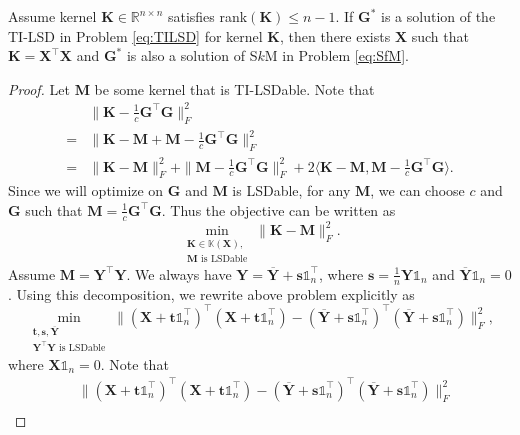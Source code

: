 \documentclass[journal]{IEEEtran}
\begin{document}
\begin{thmmm}
	Assume kernel $\mathbf{K}\in\mathbb{R}^{n\times n}$ satisfies rank$(\mathbf{K}) \leq n-1$.
	If $\mathbf{G}^*$ is a solution of the TI-LSD in Problem \eqref{eq:TILSD} for kernel $\mathbf{K}$,
	then there exists $\mathbf{X}$ such that $\mathbf{K}=\mathbf{X}^\top\mathbf{X}$ and $\mathbf{G}^*$ is also a solution of S$k$M
	in Problem \eqref{eq:SfM}.
\end{thmmm}
\begin{proof}
	Let $\mathbf{M}$ be some kernel that is TI-LSDable. Note that
	\[
	\begin{aligned}
	&\|\mathbf{K} - \frac{1}{c}\mathbf{G}^\top\mathbf{G} \|_F^2\\
	=& \|\mathbf{K} - \mathbf{M} + \mathbf{M} - \frac{1}{c}\mathbf{G}^\top\mathbf{G} \|_F^2 \\
	= &\|\mathbf{K} - \mathbf{M} \|_F^2  + \|\mathbf{M} - \frac{1}{c}\mathbf{G}^\top\mathbf{G} \|_F^2 + 2\langle \mathbf{K} - \mathbf{M}, \mathbf{M} - \frac{1}{c}\mathbf{G}^\top\mathbf{G} \rangle.
	\end{aligned}
	\]
	Since we will optimize on $\mathbf{G}$ and $\mathbf{M}$ is LSDable, for any $\mathbf{M}$, we can choose $c$ and $\mathbf{G}$ such that $\mathbf{M}=\frac{1}{c}\mathbf{G}^\top\mathbf{G}$. Thus the objective can be written as
	\[
	\min_{\substack{\mathbf{K}\in\mathbb{K}(\mathbf{X}), \\ \mathbf{M} \text{ is LSDable} }}\|\mathbf{K} - \mathbf{M} \|_F^2.
	\]
	Assume $\mathbf{M} = \mathbf{Y}^\top\mathbf{Y}$. We always have $\mathbf{Y} = \overline{\mathbf{Y}} + \mathbf{s}\mathbb{1}_n^\top$, where $\mathbf{s} = \frac{1}{n}\mathbf{Y}\mathbb{1}_n$ and $\overline{\mathbf{Y}}\mathbb{1}_n = 0$. Using this decomposition, we rewrite above problem explicitly as
	\[
	\min_{\substack{ \mathbf{t},\mathbf{s},\overline{\mathbf{Y}} \\ \mathbf{Y}^\top\mathbf{Y} \text{ is LSDable}}} 
	\|(\mathbf{X}+\mathbf{t}\mathbb{1}_n^\top)^\top(\mathbf{X}+\mathbf{t}\mathbb{1}_n^\top) - (\overline{\mathbf{Y}}+\mathbf{s}\mathbb{1}_n^\top)^\top(\overline{\mathbf{Y}}+\mathbf{s}\mathbb{1}_n^\top) \|_F^2,
	\]
	where $\mathbf{X}\mathbb{1}_n = 0$. 
	Note that
	\[
	\begin{aligned}
	&\|(\mathbf{X}+\mathbf{t}\mathbb{1}_n^\top)^\top(\mathbf{X}+\mathbf{t}\mathbb{1}_n^\top) - (\overline{\mathbf{Y}}+\mathbf{s}\mathbb{1}_n^\top)^\top(\overline{\mathbf{Y}}+\mathbf{s}\mathbb{1}_n^\top) \|_F^2 \\

\end{aligned}\]
\end{proof}
\end{document}
